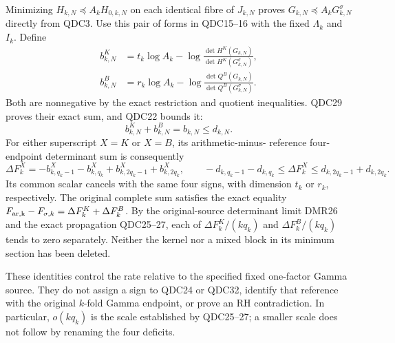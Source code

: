 Minimizing $H_{k,N}\preceq A_kH_{0,k,N}$ on each identical
fibre of $J_{k,N}$ proves
$G_{k,N}\preceq A_kG^\sigma_{k,N}$ directly from QDC3.
Use this pair of forms in QDC15--16 with the fixed
$\Lambda_k$ and $I_k$. Define
\[
 \begin{split}
 b^K_{k,N}
 &=t_k\log A_k-
      \log\frac{\det H^K(G_{k,N})}
                    {\det H^K(G^\sigma_{k,N})},\\
 b^B_{k,N}
 &=r_k\log A_k-
      \log\frac{\det Q^B(G_{k,N})}
                    {\det Q^B(G^\sigma_{k,N})}.
 \end{split}
 \tag{QDC30}
\]
Both are nonnegative by the exact restriction and quotient
inequalities. QDC29 proves their exact sum, and QDC22 bounds it:
\[
 b^K_{k,N}+b^B_{k,N}=b_{k,N}\le d_{k,N}.
 \tag{QDC31}
\]
For either superscript $X=K$ or $X=B$, its arithmetic-minus-
reference four-endpoint determinant sum is consequently
\[
 \Delta F^X_k
   =-b^X_{k,q_k-1}-b^X_{k,q_k}
                   +b^X_{k,2q_k-1}+b^X_{k,2q_k},
 \qquad
 -d_{k,q_k-1}-d_{k,q_k}\le\Delta F^X_k
      \le d_{k,2q_k-1}+d_{k,2q_k}.
 \tag{QDC32}
\]
Its common scalar cancels with the same four signs, with
dimension $t_k$ or $r_k$, respectively. The original complete
sum satisfies the exact equality
$F_{\rm ar,k}-F_{\sigma,k}=\Delta F^K_k+\Delta F^B_k$.
By the original-source determinant limit DMR26 and the exact propagation QDC25--27,
each of $\Delta F^K_k/(kq_k)$ and
$\Delta F^B_k/(kq_k)$ tends to zero separately.
Neither the kernel nor a mixed block in its minimum section
has been deleted.

These identities control the rate relative to the specified
fixed one-factor Gamma source. They do not assign a sign to
QDC24 or QDC32, identify that reference with the original
$k$-fold Gamma endpoint, or prove an RH contradiction.
In particular, $o(kq_k)$ is the scale established by
QDC25--27; a smaller scale does not follow by renaming
the four deficits.
